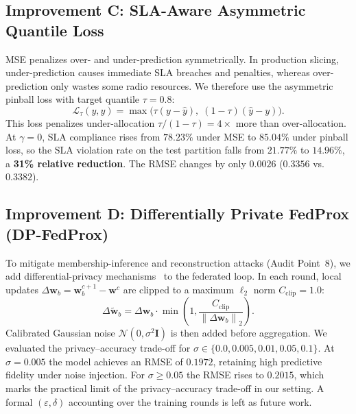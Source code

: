 \documentclass[11pt,a4paper]{article}
\begin{document}
\subsection{Improvement C: SLA-Aware Asymmetric Quantile Loss}
MSE penalizes over- and under-prediction symmetrically. In production slicing, under-prediction causes immediate SLA breaches and penalties, whereas over-prediction only wastes some radio resources. We therefore use the asymmetric pinball loss with target quantile $\tau = 0.8$:
\begin{equation}
    \mathcal{L}_{\tau}(y, \hat{y}) = \max\!\Big( \tau (y - \hat{y}),\; (1 - \tau)(\hat{y} - y) \Big).
\end{equation}
This loss penalizes under-allocation $\tau/(1-\tau) = 4\times$ more than over-allocation. At $\gamma=0$, SLA compliance rises from $78.23\%$ under MSE to $85.04\%$ under pinball loss, so the SLA violation rate on the test partition falls from $21.77\%$ to $14.96\%$, a \textbf{31\% relative reduction}. The RMSE changes by only $0.0026$ ($0.3356$ vs.\ $0.3382$).

\subsection{Improvement D: Differentially Private FedProx (DP-FedProx)}
To mitigate membership-inference and reconstruction attacks (Audit Point~8), we add differential-privacy mechanisms~\cite{dwork2014algorithmic} to the federated loop. In each round, local updates $\Delta\mathbf{w}_b = \mathbf{w}_b^{c+1} - \mathbf{w}^c$ are clipped to a maximum $\ell_2$ norm $C_{\text{clip}} = 1.0$:
\begin{equation}
    \Delta\tilde{\mathbf{w}}_b = \Delta\mathbf{w}_b \cdot \min\!\left(1, \frac{C_{\text{clip}}}{\left\|\Delta\mathbf{w}_b\right\|_2}\right).
\end{equation}
Calibrated Gaussian noise $\mathcal{N}(0, \sigma^2 \mathbf{I})$ is then added before aggregation. We evaluated the privacy--accuracy trade-off for $\sigma \in \{0.0, 0.005, 0.01, 0.05, 0.1\}$. At $\sigma = 0.005$ the model achieves an RMSE of $0.1972$, retaining high predictive fidelity under noise injection. For $\sigma \ge 0.05$ the RMSE rises to $0.2015$, which marks the practical limit of the privacy--accuracy trade-off in our setting. A formal $(\varepsilon, \delta)$ accounting over the training rounds is left as future work.
\end{document}
